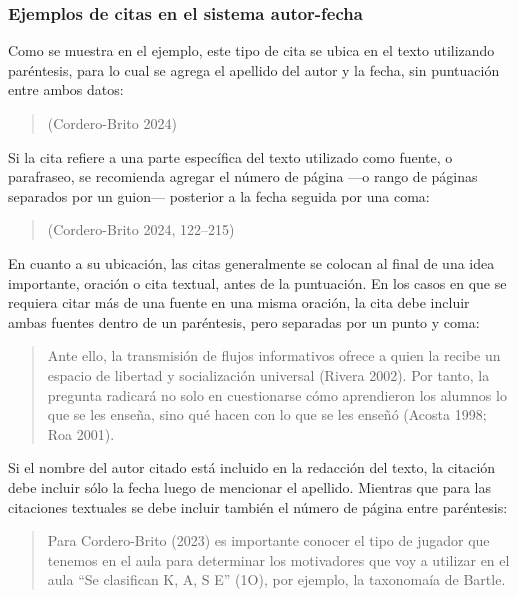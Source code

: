 \documentclass[12pt,a4paper]{article}
\begin{document}
\begin{enumerate}[resume]
\subsubsection*{Ejemplos de citas en el sistema autor-fecha}

Como se muestra en el ejemplo, este tipo de cita se ubica en el texto utilizando paréntesis, para lo cual se agrega el apellido del autor y la fecha, sin puntuación entre ambos datos:

\begin{quote}
(Cordero-Brito 2024)
\end{quote}

Si la cita refiere a una parte específica del texto utilizado como fuente, o parafraseo, se recomienda agregar el número de página ---o rango de páginas separados por un guion--- posterior a la fecha seguida por una coma:

\begin{quote}
(Cordero-Brito 2024, 122--215)
\end{quote}

En cuanto a su ubicación, las citas generalmente se colocan al final de una idea importante, oración o cita textual, antes de la puntuación.  
En los casos en que se requiera citar más de una fuente en una misma oración, la cita debe incluir ambas fuentes dentro de un paréntesis, pero separadas por un punto y coma:

\begin{quote}
Ante ello, la transmisión de flujos informativos ofrece a quien la recibe un espacio de libertad y socialización universal (Rivera 2002). Por tanto, la pregunta radicará no solo en cuestionarse cómo aprendieron los alumnos lo que se les enseña, sino qué hacen con lo que se les enseñó (Acosta 1998; Roa 2001).
\end{quote}

Si el nombre del autor citado está incluido en la redacción del texto, la citación debe incluir sólo la fecha luego de mencionar el apellido.  
Mientras que para las citaciones textuales se debe incluir también el número de página entre paréntesis:

\begin{quote}
Para Cordero-Brito (2023) es importante conocer el tipo de jugador que tenemos en el aula para determinar los motivadores que voy a utilizar en el aula ``Se clasifican K, A, S E'' (1O), por ejemplo, la taxonomaía de Bartle.
\end{quote}




\end{enumerate}
\end{document}
